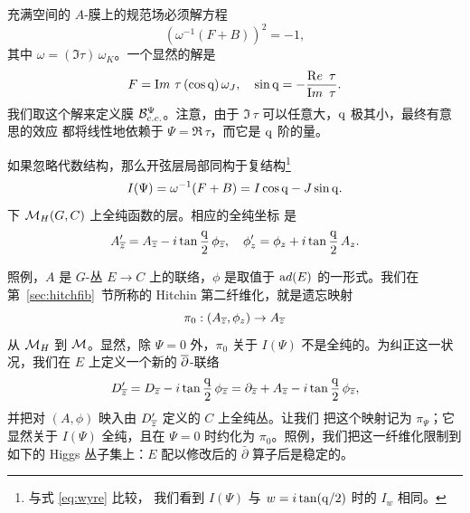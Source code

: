 充满空间的 $A$-膜上的规范场必须解方程 %
\setcounter{equation}{29}
\begin{equation}\label{eq:juko}
(\omega^{-1}(F+B))^2=-1,
\end{equation}
 其中
$\omega=(\Im\tau)\, \omega_K$。一个显然的解是 %
\setcounter{equation}{30}
\begin{equation}\label{eq:uko}
F=
\Im\tau\, (\cos{\eurm q})\, \omega_J,\quad \sin{\eurm q}=-{{\Re\,
\tau}\over {\Im\, \tau}}.
\end{equation}
  我们取这个解来定义膜 ${\cal B}_{c.c.}^\Psi$。注意，由于
${\Im\,\tau}$ 可以任意大，${\eurm q}$ 极其小，最终有意思的效应
都将线性地依赖于 $\Psi=\Re\,\tau$，而它是 ${\eurm q}$ 阶的量。

如果忽略代数结构，那么开弦层局部同构于复结构\footnote{与式 \eqref{eq:wyre} 比较，
我们看到 $I(\Psi)$ 与 $w=i\tan({\eurm
q}/2)$ 时的 $I_w$ 相同。} %
\setcounter{equation}{31}
\begin{equation}\label{eq:muko}
I(\Psi)=\omega^{-1}(F+B)=I \cos{\eurm q} -
J\sin{\eurm q}.
\end{equation}
 下 $\MH(G,C)$ 上全纯函数的层。相应的全纯坐标
是 %
\setcounter{equation}{32}
\begin{equation}\label{eq:suko}
A'_\bz=A_\bz - i \tan{{\eurm q}\over
2}\, \phi_\bz,\quad \phi'_z=\phi_z+i\tan{{\eurm q}\over 2}\, A_z.
\end{equation}

照例，$A$ 是 $G$-丛 $E\to C$ 上的联络，$\phi$ 是取值于
${\rm ad}(E)$ 的一形式。我们在第~\ref{sec:hitchfib}~节所称的
Hitchin 第二纤维化，就是遗忘映射
\setcounter{equation}{33}
\begin{equation}\label{eq:xnonko}
\pi_0: (A_\bz,\phi_z)\to A_\bz
\end{equation}
 从 $\MH$ 到 $\M$。显然，除 $\Psi=0$ 外，$\pi_0$ 关于 $I(\Psi)$
不是全纯的。为纠正这一状况，我们在 $E$ 上定义一个新的
$\bpartial$-联络 %
\setcounter{equation}{34}
\begin{equation}\label{eq:hoxo}
D'_\bz=D_\bz-i
\tan{{\eurm q}\over 2}\,\phi_\bz=\partial_\bz+A_\bz - i
\tan{{\eurm q}\over 2}\,\phi_\bz,
\end{equation}
 并把对 $(A,\phi)$ 映入由 $D'_\bz$ 定义的 $C$ 上全纯丛。让我们
把这个映射记为 $\pi_\Psi$；它显然关于 $I(\Psi)$ 全纯，且在
$\Psi=0$ 时约化为 $\pi_0$。照例，我们把这一纤维化限制到如下的
Higgs 丛子集上：$E$ 配以修改后的 $\bar\partial$ 算子后是稳定的。

